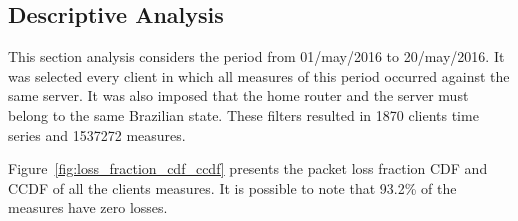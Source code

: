 \subsection{Descriptive Analysis}

This section analysis considers the period from 01/may/2016 to 20/may/2016. It was selected every client in which all measures of this period occurred against the same server. It was also imposed that the home router and the server must belong to the same Brazilian state. These filters resulted in 1870 clients time series and 1537272 measures.

Figure~\ref{fig:loss_fraction_cdf_ccdf} presents the packet loss fraction CDF and CCDF of all the clients measures. It is possible to note that 93.2\% of the measures have zero losses.

\begin{figure}[H]
\end{figure}

